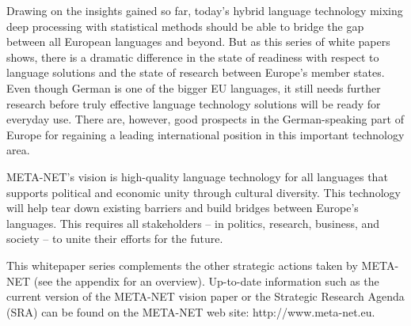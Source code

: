 \documentclass[]{../../metanetpaper}
\begin{document}
\begin{multicols}{2}

Drawing on the insights gained so far, today’s hybrid language technology mixing deep processing with statistical methods should be able to bridge the gap between all European languages and beyond. But as this series of white papers shows, there is a dramatic difference in the state of readiness with respect to language solutions and the state of research between Europe’s member states. Even though German is one of the bigger EU languages, it still needs further research before truly effective language technology solutions will be ready for everyday use. There are, however, good prospects in the German-speaking part of Europe for regaining a leading international position in this important technology area. 

META-NET’s vision is high-quality language technology for all languages that supports political and economic unity through cultural diversity. This technology will help tear down existing barriers and build bridges between Europe’s languages. This requires all stakeholders -- in politics, research, business, and society -- to unite their efforts for the future.

This whitepaper series complements the other strategic actions taken by META-NET (see the appendix for an overview). Up-to-date information such as the current version of the META-NET vision paper \cite{Meta1} or the Strategic Research Agenda (SRA) can be found on the META-NET web site: http://www.meta-net.eu.
\end{multicols}

\clearpage

\end{document}
